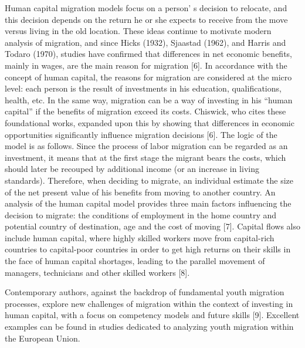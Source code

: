 {Human capital migration models focus on a person' s
decision to relocate, and this decision depends on the return he or she
expects to receive from the move versus living in the old location.
These ideas continue to motivate modern analysis of migration, and since
Hicks (1932), Sjaastad (1962), and Harris and Todaro (1970), studies
have confirmed that differences in net economic benefits, mainly in
wages, are the main reason for migration {[}6{]}. In accordance with the
concept of human capital, the reasons for migration are considered at
the micro level: each person is the result of investments in his
education, qualifications, health, etc. In the same way, migration can
be a way of investing in his ``human capital'' if the benefits of
migration exceed its costs. Chiswick, who cites these foundational
works, expanded upon this by showing that differences in economic
opportunities significantly influence migration decisions {[}6{]}. The
logic of the model is as follows. Since the process of labor migration
can be regarded as an investment, it means that at the first stage the
migrant bears the costs, which should later be recouped by additional
income (or an increase in living standards). Therefore, when deciding to
migrate, an individual estimate the size of the net present value of his
benefits from moving to another country. An analysis of the human
capital model provides three main factors influencing the decision to
migrate: the conditions of employment in the home country and potential
country of destination, age and the cost of moving {[}7{]}. Capital
flows also include human capital, where highly skilled workers move from
capital-rich countries to capital-poor countries in order to get high
returns on their skills in the face of human capital shortages, leading
to the parallel movement of managers, technicians and other skilled
workers {[}8{]}.

Contemporary authors, against the backdrop of fundamental youth
migration processes, explore new challenges of migration within the
context of investing in human capital, with a focus on competency models
and future skills {[}9{]}. Excellent examples can be found in studies
dedicated to analyzing youth migration within the European Union.

}
